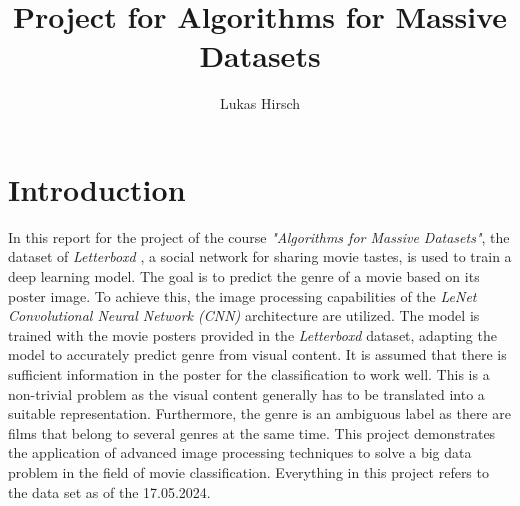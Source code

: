 \documentclass[a4paper, 11pt]{article}
\title{Project for Algorithms for Massive Datasets}
\author{Lukas Hirsch}
\date{}
\begin{document}
\maketitle
\vspace{13cm}
\noindent{}

\pagebreak
\tableofcontents
\pagebreak

\section{Introduction}
    In this report for the project of the course \textit{"Algorithms for Massive Datasets"}, the dataset of \textit{Letterboxd} \cite{Letterboxd}, a social network for sharing movie tastes, is used to train a deep learning model. The goal is to predict the genre of a movie based on its poster image. To achieve this, the image processing capabilities of the \textit{LeNet Convolutional Neural Network (CNN)} architecture are utilized. The model is trained with the movie posters provided in the \textit{Letterboxd} dataset, adapting the model to accurately predict genre from visual content. It is assumed that there is sufficient information in the poster for the classification to work well. This is a non-trivial problem as the visual content generally has to be translated into a suitable representation. Furthermore, the genre is an ambiguous label as there are films that belong to several genres at the same time. This project demonstrates the application of advanced image processing techniques to solve a big data problem in the field of movie classification. Everything in this project refers to the data set as of the 17.05.2024.
\end{document}
